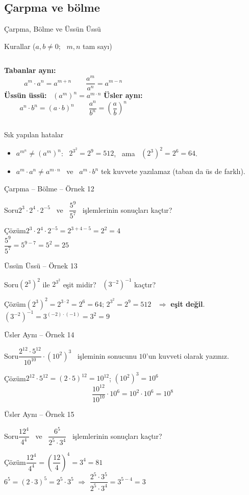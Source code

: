 \documentclass[aspectratio=169,11pt]{beamer}
\newcommand{\soru}[3]{%
\begin{frame}{#1}
  \begin{block}{Soru}\large #2\end{block}
  \pause
  \begin{exampleblock}{Çözüm}\large #3\end{exampleblock}
\end{frame}}
\begin{document}
\subsection{Çarpma ve bölme}
\begin{frame}{Çarpma, Bölme ve Üssün Üssü}
\begin{block}{Kurallar (\(a,b\neq 0\); \ \(m,n\) tam sayı)}
\begin{columns}[t]
\textbf{Tabanlar aynı:}
\[a^m\cdot a^n=a^{m+n}\qquad \frac{a^m}{a^n}=a^{m-n}\]
\textbf{Üssün üssü:} \ \((a^m)^n=a^{m\cdot n}\)
\textbf{Üsler aynı:}
\[a^n\cdot b^n=(a\cdot b)^n\qquad \frac{a^n}{b^n}=\left(\frac{a}{b}\right)^n\]
\end{columns}
\end{block}
\begin{alertblock}{Sık yapılan hatalar}
\begin{itemize}
\item \(a^{m^n}\neq(a^m)^n\): \ \(2^{3^2}=2^{9}=512\), \ ama \ \((2^3)^2=2^6=64\).
\item \(a^m\cdot a^n\neq a^{m\cdot n}\) \ ve \ \(a^m\cdot b^n\) tek kuvvete yazılamaz (taban da üs de farklı).
\end{itemize}
\end{alertblock}
\end{frame}

\soru{Çarpma -- Bölme -- Örnek 12}
{\(2^3\cdot 2^4\cdot 2^{-5}\) \ ve \ \(\dfrac{5^9}{5^7}\) \ işlemlerinin sonuçları kaçtır?}
{\(2^3\cdot 2^4\cdot 2^{-5}=2^{3+4-5}=2^2=4\)\\[4pt]
\(\dfrac{5^9}{5^7}=5^{9-7}=5^2=25\)}

\soru{Üssün Üssü -- Örnek 13}
{\((2^3)^2\) ile \(2^{3^2}\) eşit midir? \ \((3^{-2})^{-1}\) kaçtır?}
{\((2^3)^2=2^{3\cdot 2}=2^6=64\); \qquad \(2^{3^2}=2^{9}=512\) \ \(\Rightarrow\) \textbf{eşit değil}.\\[4pt]
\((3^{-2})^{-1}=3^{(-2)\cdot(-1)}=3^2=9\)}

\soru{Üsler Aynı -- Örnek 14}
{\(\dfrac{2^{12}\cdot 5^{12}}{10^{10}}\cdot (10^2)^3\) \ işleminin sonucunu \(10\)'un kuvveti olarak yazınız.}
{\(2^{12}\cdot 5^{12}=(2\cdot 5)^{12}=10^{12}\); \qquad \((10^2)^3=10^6\)
\[\frac{10^{12}}{10^{10}}\cdot 10^6=10^{2}\cdot 10^{6}=10^{8}\]}

\soru{Üsler Aynı -- Örnek 15}
{\(\dfrac{12^4}{4^4}\) \ ve \ \(\dfrac{6^5}{2^5\cdot 3^4}\) \ işlemlerinin sonuçları kaçtır?}
{\(\dfrac{12^4}{4^4}=\left(\dfrac{12}{4}\right)^4=3^4=81\)\\[4pt]
\(6^5=(2\cdot 3)^5=2^5\cdot 3^5\) \(\Rightarrow\) \(\dfrac{2^5\cdot 3^5}{2^5\cdot 3^4}=3^{5-4}=3\)}
\end{document}
